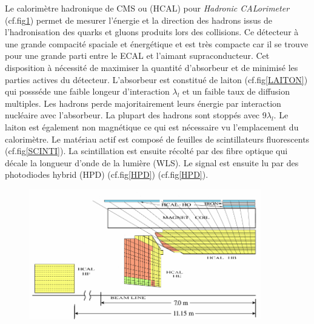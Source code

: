 Le calorimètre hadronique de CMS ou (HCAL) pour \textit{Hadronic CALorimeter} (cf.fig\ref{HCAL}) permet de mesurer l'énergie et la direction des hadrons issus de l'hadronisation des quarks et gluons produits lors des collisions. Ce détecteur à une grande compacité spaciale et énergétique et est très compacte car il se trouve pour une grande parti entre le ECAL et l'aimant supraconducteur. Cet disposition à nécessité de maximiser la quantité d'absorbeur et de minimisé les parties actives du détecteur. L'absorbeur est constitué de laiton (cf.fig\ref{LAITON}) qui possséde une faible longeur d'interaction $\lambda_{l}$ et un faible taux de diffusion multiples. Les hadrons perde majoritairement leurs énergie par interaction nucléaire avec l'absorbeur. La plupart des hadrons sont stoppés avec 9$\lambda_{l}$. Le laiton est également non magnétique ce qui est nécessaire vu l'emplacement du calorimètre. Le matériau actif est composé de feuilles de scintillateurs fluorescents (cf.fig\ref{SCINTI}). La scintillation est ensuite récolté par des fibre optique qui décale la longueur d'onde de la lumière (WLS). Le signal est ensuite lu par des photodiodes hybrid (HPD) (cf.fig\ref{HPD}) (cf.fig\ref{HPD}).
\begin{figure}[ht!]
	\centering
	\includegraphics[width=0.90\textwidth]{CMS/HCALSCHEME.png}
	\label{HCAL}
\end{figure}


